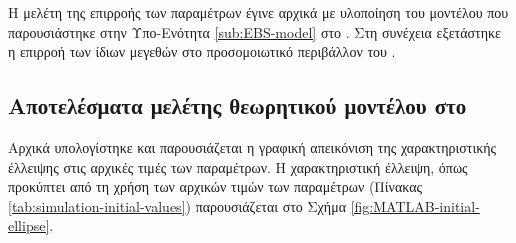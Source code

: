 Η μελέτη της επιρροής των παραμέτρων έγινε αρχικά με υλοποίηση του μοντέλου που παρουσιάστηκε στην Υπο-Ενότητα \ref{sub:EBS-model} στο .
Στη συνέχεια εξετάστηκε η επιρροή των ίδιων μεγεθών στο προσομοιωτικό περιβάλλον του .

\subsection{Αποτελέσματα μελέτης θεωρητικού μοντέλου στο }

Αρχικά υπολογίστηκε και παρουσιάζεται η γραφική απεικόνιση της χαρακτηριστικής έλλειψης στις αρχικές τιμές των παραμέτρων.
Η χαρακτηριστική έλλειψη, όπως προκύπτει από τη χρήση των αρχικών τιμών των παραμέτρων (Πίνακας \ref{tab:simulation-initial-values}) παρουσιάζεται στο Σχήμα \ref{fig:MATLAB-initial-ellipse}.

